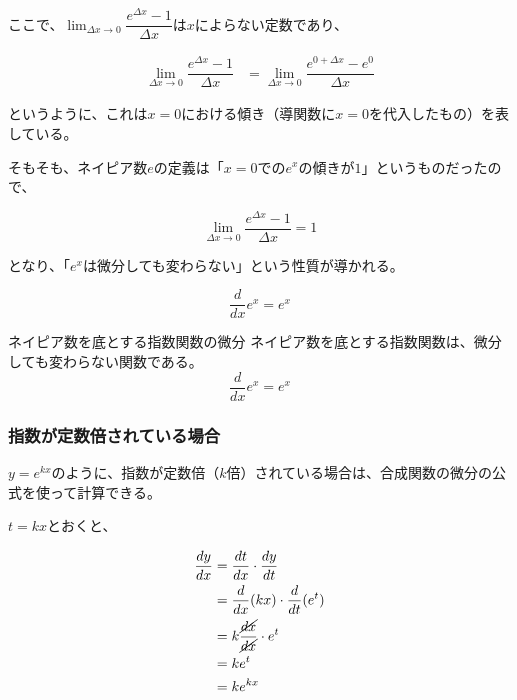 \documentclass[../../imaging-math]{subfiles}
\begin{document}
ここで、$\displaystyle\lim_{\Delta x \to 0} \dfrac{e^{\Delta x} - 1}{\Delta x}$は$x$によらない定数であり、

\begin{align}
  \lim_{\Delta x \to 0} \dfrac{e^{\Delta x} - 1}{\Delta x} & = \lim_{\Delta x \to 0} \dfrac{e^{0 + \Delta x} - e^0}{\Delta x}
\end{align}

というように、これは$x=0$における傾き（導関数に$x=0$を代入したもの）を表している。

そもそも、ネイピア数$e$の定義は「$x=0$での$e^x$の傾きが$1$」というものだったので、

\begin{equation}
  \lim_{\Delta x \to 0} \dfrac{e^{\Delta x} - 1}{\Delta x} = 1
\end{equation}

となり、「$e^x$は微分しても変わらない」という性質が導かれる。

\begin{equation}
  \dfrac{d}{dx}e^x = e^x
\end{equation}

\begin{theorem}{ネイピア数を底とする指数関数の微分}
  \titlegap
  ネイピア数を底とする指数関数は、微分しても変わらない関数である。
  \LARGE
  \begin{equation}
    \dfrac{d}{dx}e^x = e^x
  \end{equation}
\end{theorem}

\subsubsection{指数が定数倍されている場合}

$y = e^{kx}$のように、指数が定数倍（$k$倍）されている場合は、合成関数の微分の公式を使って計算できる。

$t=kx$とおくと、

\begin{align}
  \dfrac{dy}{dx} & = \dfrac{dt}{dx} \cdot \dfrac{dy}{dt}          \\
                 & = \dfrac{d}{dx} (kx) \cdot \dfrac{d}{dt} (e^t) \\
                 & = k\dfrac{\cancel{dx}}{\cancel{dx}} \cdot e^t  \\
                 & = ke^{t}                                       \\
                 & = ke^{kx}
\end{align}
\end{document}
